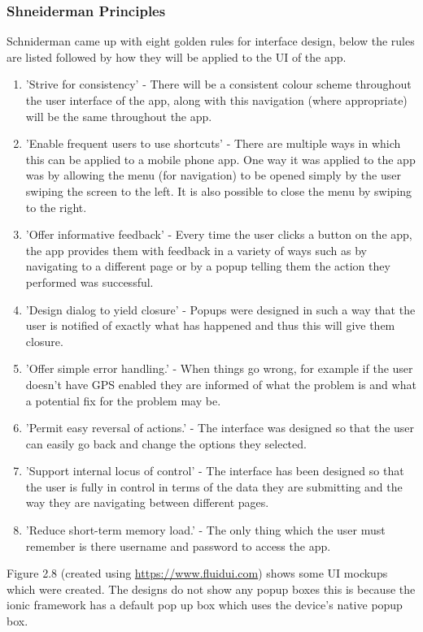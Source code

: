 \subsubsection{Shneiderman Principles}
Schniderman came up with eight golden rules for interface design, below the rules are listed followed by how they will be applied to the UI of the app. \cite{sch}
\begin{enumerate}
	\item 'Strive for consistency' - There will be a consistent colour scheme throughout the user interface of the app, along with this navigation (where appropriate) will be the same throughout the app.
	\item 'Enable frequent users to use shortcuts' - There are multiple ways in which this can be applied to a mobile phone app. One way it was applied to the app was by allowing the menu (for navigation) to be opened simply by the user swiping the screen to the left. It is also possible to close the menu by swiping to the right.
	\item 'Offer informative feedback' - Every time the user clicks a button on the app, the app provides them with feedback in a variety of ways such as by navigating to a different page or by a popup telling them the action they performed was successful.
	\item 'Design dialog to yield closure' - Popups were designed in such a way that the user is notified of exactly what has happened and thus this will give them closure.
	\item 'Offer simple error handling.' - When things go wrong, for example if the user doesn't have GPS enabled they are informed of what the problem is and what a potential fix for the problem may be.
	\item 'Permit easy reversal of actions.' - The interface was designed so that the user can easily go back and change the options they selected.
	\item 'Support internal locus of control' - The interface has been designed so that the user is fully in control in terms of the data they are submitting and the way they are navigating between different pages.
	\item 'Reduce short-term memory load.' - The only thing which the user must remember is there username and password to access the app.
\end{enumerate}
Figure 2.8 (created using \url {https://www.fluidui.com}) shows some UI mockups which were created. The designs do not show any popup boxes this is because the ionic framework has a default pop up box which uses the device's native popup box.
